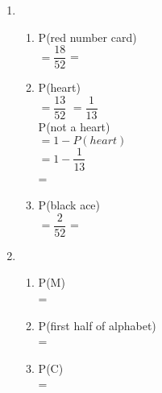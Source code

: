 \begin{multicols}{2}
\begin{enumerate}[label = \arabic*. ]
\begin{enumerate}[label = \alph*. ]
\end{enumerate} 
\item %
\begin{enumerate}[label = \alph*. ]
\item P(red number card) \\
$ =\dfrac{18}{52} $ \redcheck %
= \redcheck 
 
\item P(heart)  \\
$ =\dfrac{13}{52} $ \redcheck %
$ =\dfrac{1}{13} $ \redcheck \\
P(not a heart)  \\
$ =1-P(heart) $ \redcheck \\
$ =1-\dfrac{1}{13} $ \redcheck \\
= \redcheck 
\item P(black ace) \\
$ =\dfrac{2}{52} $ \redcheck %
= \redcheck 
\end{enumerate} 
\item %
\begin{enumerate}[label = \alph*. ]
\item P(M) \\
= \redcheck 
\item P(first half of alphabet) \\ 
= \redcheck 
\item P(C) \\
= \redcheck 
\end{enumerate} 
 
\end{enumerate}   

\end{multicols} 
 

